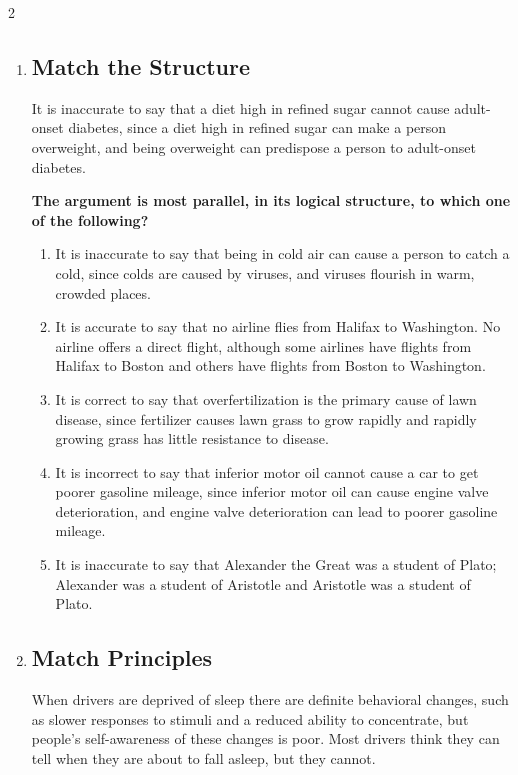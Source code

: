 \documentclass[9pt]{article}
\begin{document}
\begin{multicols}{2}
\begin{enumerate}
\item
\subsection*{Match the Structure}

\noindent
It is inaccurate to say that a diet high in refined sugar cannot cause adult-onset diabetes, since a diet high in refined sugar can make a person overweight, and being overweight can predispose a person to adult-onset diabetes.

 

\noindent
\textbf{The argument is most parallel, in its logical structure, to which one of the following?}

\begin{enumerate}[label=(\alph*)]
    \item It is inaccurate to say that being in cold air can cause a person to catch a cold, since colds are caused by viruses, and viruses flourish in warm, crowded places.
    \item It is accurate to say that no airline flies from Halifax to Washington. No airline offers a direct flight, although some airlines have flights from Halifax to Boston and others have flights from Boston to Washington.
    \item It is correct to say that overfertilization is the primary cause of lawn disease, since fertilizer causes lawn grass to grow rapidly and rapidly growing grass has little resistance to disease.
    \item It is incorrect to say that inferior motor oil cannot cause a car to get poorer gasoline mileage, since inferior motor oil can cause engine valve deterioration, and engine valve deterioration can lead to poorer gasoline mileage.
    \item It is inaccurate to say that Alexander the Great was a student of Plato; Alexander was a student of Aristotle and Aristotle was a student of Plato.
\end{enumerate}

\item
\subsection*{Match Principles}

\noindent
When drivers are deprived of sleep there are definite behavioral changes, such as slower responses to stimuli and a reduced ability to concentrate, but people's self-awareness of these changes is poor. Most drivers think they can tell when they are about to fall asleep, but they cannot.


\end{enumerate}
\end{multicols}
\end{document}

